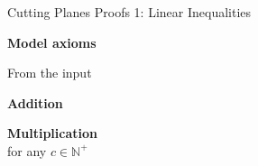 \documentclass[aspectratio=169,compress,10pt]{beamer}
\begin{document}
\begin{frame}{Cutting Planes Proofs 1: Linear Inequalities}
    \begin{minipage}[c]{0.35\framewidth}
        \textcolor{uofgcobalt}{\textbf{Model axioms}}
    \end{minipage}\hfill\begin{minipage}[c]{0.60\framewidth}
        \centering From the input
    \end{minipage}\bigskip

    \begin{minipage}[c]{0.35\framewidth}
        \textcolor{uofgcobalt}{\textbf{Addition}}
    \end{minipage}\hfill\begin{minipage}[c]{0.60\framewidth}\begin{prooftree}
    \end{prooftree}\end{minipage}\bigskip

    \begin{minipage}[c]{0.35\framewidth}
        \textcolor{uofgcobalt}{\textbf{Multiplication}}\\
        for any $c \in \mathbb{N^+}$
    \end{minipage}\hfill\begin{minipage}[c]{0.60\framewidth}\begin{prooftree}
    \end{prooftree}\end{minipage}
\end{frame}
\end{document}
